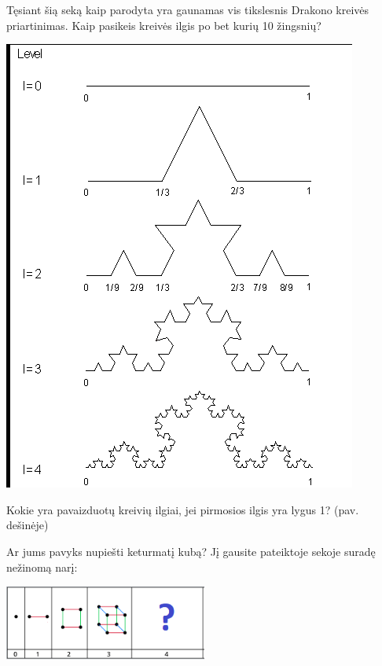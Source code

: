 \documentclass[a4paper]{article}
\begin{document}
\begin{enumerate}
\begin{minipage}[b]{0.65\textwidth}
\item  Tęsiant šią seką kaip parodyta yra gaunamas vis tikslesnis Drakono kreivės priartinimas. Kaip pasikeis kreivės ilgis po bet kurių 10 žingsnių?
\end{minipage}
\hspace{\fill}
\begin{minipage}[b]{0.3\textwidth}
\includegraphics[width=\textwidth]{ikoch.png}
\end{minipage}

\item Kokie yra pavaizduotų kreivių ilgiai, jei pirmosios ilgis yra lygus 1? (pav. dešinėje)

\item Ar jums pavyks nupiešti keturmatį kubą? Jį gausite pateiktoje sekoje suradę nežinomą narį:

\includegraphics[width=0.5\textwidth]{hypercube.png}


\end{enumerate}
\end{document}
